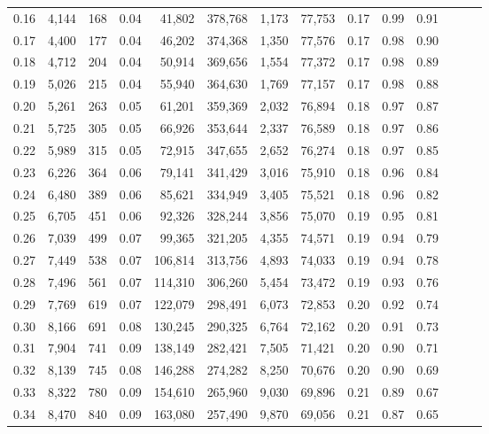 \begin{tabular}{rrrrrrrrrrrrrr}
0.16 &  4,144 &    168 &  0.04 &   41,802 &  378,768 &   1,173 &  77,753 &  0.17 &  0.99 &      0.91 \\
0.17 &  4,400 &    177 &  0.04 &   46,202 &  374,368 &   1,350 &  77,576 &  0.17 &  0.98 &      0.90 \\
0.18 &  4,712 &    204 &  0.04 &   50,914 &  369,656 &   1,554 &  77,372 &  0.17 &  0.98 &      0.89 \\
0.19 &  5,026 &    215 &  0.04 &   55,940 &  364,630 &   1,769 &  77,157 &  0.17 &  0.98 &      0.88 \\
0.20 &  5,261 &    263 &  0.05 &   61,201 &  359,369 &   2,032 &  76,894 &  0.18 &  0.97 &      0.87 \\
0.21 &  5,725 &    305 &  0.05 &   66,926 &  353,644 &   2,337 &  76,589 &  0.18 &  0.97 &      0.86 \\
0.22 &  5,989 &    315 &  0.05 &   72,915 &  347,655 &   2,652 &  76,274 &  0.18 &  0.97 &      0.85 \\
0.23 &  6,226 &    364 &  0.06 &   79,141 &  341,429 &   3,016 &  75,910 &  0.18 &  0.96 &      0.84 \\
0.24 &  6,480 &    389 &  0.06 &   85,621 &  334,949 &   3,405 &  75,521 &  0.18 &  0.96 &      0.82 \\
0.25 &  6,705 &    451 &  0.06 &   92,326 &  328,244 &   3,856 &  75,070 &  0.19 &  0.95 &      0.81 \\
0.26 &  7,039 &    499 &  0.07 &   99,365 &  321,205 &   4,355 &  74,571 &  0.19 &  0.94 &      0.79 \\
0.27 &  7,449 &    538 &  0.07 &  106,814 &  313,756 &   4,893 &  74,033 &  0.19 &  0.94 &      0.78 \\
0.28 &  7,496 &    561 &  0.07 &  114,310 &  306,260 &   5,454 &  73,472 &  0.19 &  0.93 &      0.76 \\
0.29 &  7,769 &    619 &  0.07 &  122,079 &  298,491 &   6,073 &  72,853 &  0.20 &  0.92 &      0.74 \\
0.30 &  8,166 &    691 &  0.08 &  130,245 &  290,325 &   6,764 &  72,162 &  0.20 &  0.91 &      0.73 \\
0.31 &  7,904 &    741 &  0.09 &  138,149 &  282,421 &   7,505 &  71,421 &  0.20 &  0.90 &      0.71 \\
0.32 &  8,139 &    745 &  0.08 &  146,288 &  274,282 &   8,250 &  70,676 &  0.20 &  0.90 &      0.69 \\
0.33 &  8,322 &    780 &  0.09 &  154,610 &  265,960 &   9,030 &  69,896 &  0.21 &  0.89 &      0.67 \\
0.34 &  8,470 &    840 &  0.09 &  163,080 &  257,490 &   9,870 &  69,056 &  0.21 &  0.87 &      0.65 \\

\end{tabular}

